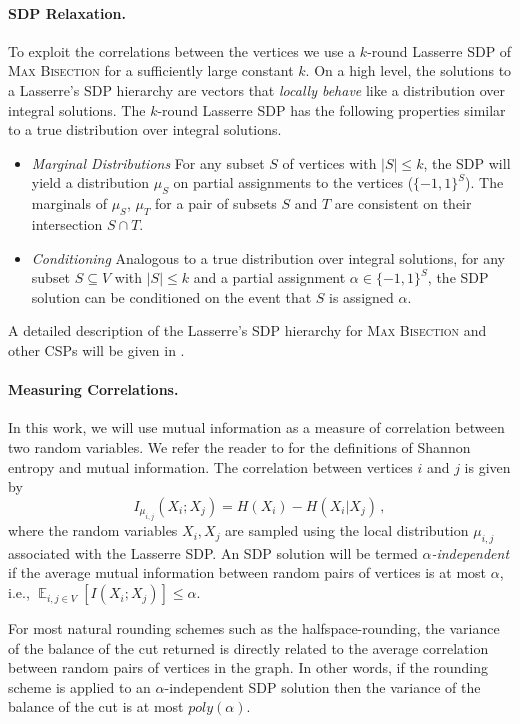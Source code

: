 \documentclass[11pt]{article}
\theoremstyle{definition}
\newcommand{\Esymb}{\mathbb{E}}
\DeclareMathOperator*{\E}{\Esymb}
\newcommand{\mcom}{\,,}
\newcommand{\problemmacro}[1]{\texorpdfstring{\textsc{#1}}{#1}\xspace}
\newcommand{\maxbisection}{\problemmacro{Max Bisection}}
\renewcommand{\leq}{\leqslant}
\numberwithin{equation}{section}
\let\origparagraph\paragraph
\renewcommand{\paragraph}[1]{\origparagraph{#1.}}
\let\pref=\prettyref
\begin{document}
\paragraph{SDP Relaxation}
To exploit the correlations between the vertices we use a $k$-round Lasserre SDP
\cite{Lasserre01} of \maxbisection for a sufficiently large constant $k$.  On a high
level, the solutions to a Lasserre's SDP hierarchy are vectors
that {\it locally behave} like a distribution over integral solutions.
The $k$-round Lasserre SDP has the following properties similar to
a true distribution over integral solutions.
\begin{itemize}
\item {\it Marginal Distributions} For any subset $S$ of vertices with $|S|\leq k$, the SDP will
yield a distribution $\mu_S$ on partial assignments to the vertices
($\{-1,1\}^S$).  The marginals of $\mu_S$, $\mu_T$ for a pair of
subsets $S$ and $T$ are consistent on their intersection $S \cap T$.
\item {\it Conditioning} Analogous to a true distribution over
integral solutions, for any subset $S \subseteq V$ with $|S| \leq k$
and a partial assignment $\alpha \in \{-1,1\}^S$, the SDP solution can
be conditioned on the event that $S$ is assigned $\alpha$.
\end{itemize}
A detailed description of the Lasserre's SDP hierarchy for \maxbisection and other CSPs will be given in \pref{sec:prelim}.

\paragraph{Measuring Correlations}

  In this work, we will use mutual
information as a measure of correlation between two random variables.
We refer the reader to \pref{sec:prelim} for the definitions of
Shannon entropy and mutual information.  The correlation between vertices $i$ and $j$ is given by
$$I_{\mu_{i,j}}(X_i; X_j) = H(X_i) - H(X_i|X_j) \mcom$$
where the random variables $X_i,X_j$ are sampled using the local distribution
$\mu_{i,j}$ associated with the Lasserre SDP.
An SDP solution will be termed {\it $\alpha$-independent} if the average
mutual information between random pairs of vertices is at most
$\alpha$, i.e., $\E_{i,j \in V}[I(X_i;X_j)] \leq \alpha$.

For most natural rounding schemes such as the halfspace-rounding, the variance
of the balance of the cut returned is
directly related to the average correlation between random pairs
of vertices in the graph.  In other words, if the rounding scheme is
applied to an $\alpha$-independent SDP solution then the variance of
the balance of the cut is at most $poly(\alpha)$.
\end{document}
